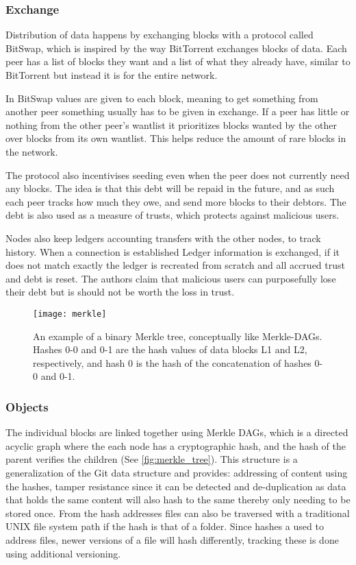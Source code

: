 \subsubsection{Exchange}
Distribution of data happens by exchanging blocks with a protocol called BitSwap, which is inspired by the way BitTorrent exchanges blocks of data. Each peer has a list of blocks they want and a list of what they already have, similar to BitTorrent but instead it is for the entire network.

In BitSwap values are given to each block, meaning to get something from another peer something usually has to be given in exchange. If a peer has little or nothing from the other peer's wantlist it prioritizes blocks wanted by the other over blocks from its own wantlist. This helps reduce the amount of rare blocks in the network.

The protocol also incentivises seeding even when the peer does not currently need any blocks. The idea is that this debt will be repaid in the future, and as such each peer tracks how much they owe, and send more blocks to their debtors. The debt is also used as a measure of trusts, which protects against malicious users.

Nodes also keep ledgers accounting transfers with the other nodes, to track history. When a connection is established Ledger information is exchanged, if it does not match exactly the ledger is recreated from scratch and all accrued trust and debt is reset. The authors claim that malicious users can purposefully lose their debt but is should not be worth the loss in trust.

\begin{figure}[ht]
    \centering
    \texttt{[image: merkle]}
    \caption[A Merkle Tree]{An example of a binary Merkle tree, conceptually like Merkle-\acsp{DAG}. Hashes 0-0 and 0-1 are the hash values of data blocks L1 and L2, respectively, and hash 0 is the hash of the concatenation of hashes 0-0 and 0-1.}
    \label{fig:merkle_tree}
\end{figure}

\subsubsection{Objects}
\label{sec:ipfs-objects}
The individual blocks are linked together using Merkle \acp{DAG}, which is a directed acyclic graph where the each node has a cryptographic hash, and the hash of the parent verifies the children (See \autoref{fig:merkle_tree}). This structure is a generalization of the Git data structure and provides: addressing of content using the hashes, tamper resistance since it can be detected and de-duplication as data that holds the same content will also hash to the same thereby only needing to be stored once. From the hash addresses files can also be traversed with a traditional UNIX file system path if the hash is that of a folder.
Since hashes a used to address files, newer versions of a file will hash differently, tracking these is done using additional versioning.



